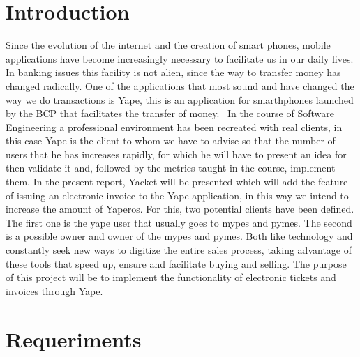 \documentclass{article}
\begin{document}
\section{Introduction}
Since the evolution of the internet and the creation of smart phones, mobile applications have become increasingly necessary to facilitate us in our daily lives. In banking issues this facility is not alien, since the way to transfer money has changed radically. One of the applications that most sound and have changed the way we do transactions is Yape, this is an application for smarthphones launched by the BCP that facilitates the transfer of money.
 In the course of Software Engineering a professional environment has been recreated with real clients, in this case Yape is the client to whom we have to advise so that the number of users that he has increases rapidly, for which he will have to present an idea for then validate it and, followed by the metrics taught in the course, implement them. In the present report, Yacket will be presented which will add the feature of issuing an electronic invoice to the Yape application, in this way we intend to increase the amount of Yaperos.
For this, two potential clients have been defined. The first one is the yape user that usually goes to mypes and pymes. The second is a possible owner and owner of the mypes and pymes. Both like technology and constantly seek new ways to digitize the entire sales process, taking advantage of these tools that speed up, ensure and facilitate buying and selling.
The purpose of this project will be to implement the functionality of electronic tickets and invoices through Yape.


\section{Requeriments}
\end{document}
